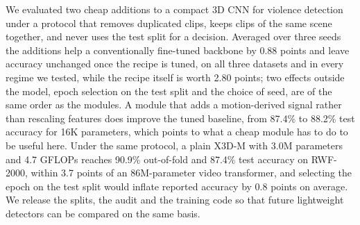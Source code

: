 \documentclass[conference]{IEEEtran}
\begin{document}
We evaluated two cheap additions to a compact 3D CNN for violence
detection under a protocol that removes duplicated clips, keeps clips of
the same scene together, and never uses the test split for a decision. Averaged over three seeds the additions help a conventionally fine-tuned
backbone by 0.88 points and leave accuracy unchanged once the recipe is
tuned, on all three datasets and in every regime we tested, while the
recipe itself is worth 2.80 points; two effects outside the model, epoch
selection on the test split and the choice of seed, are of the same order
as the modules. A module that adds a motion-derived signal rather than
rescaling features does improve the tuned baseline, from 87.4\% to 88.2\%
test accuracy for 16K parameters, which points to what a cheap module has
to do to be useful here. Under
the same protocol, a plain X3D-M with 3.0M parameters and 4.7 GFLOPs
reaches 90.9\% out-of-fold and 87.4\% test accuracy on RWF-2000, within
3.7 points of an 86M-parameter video transformer, and selecting the epoch
on the test split would inflate reported accuracy by 0.8 points on
average. We release the splits, the audit and the training code so that
future lightweight detectors can be compared on the same basis.



\end{document}
